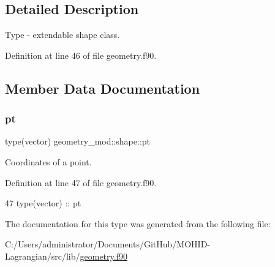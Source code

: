 \subsection{Detailed Description}
Type -\/ extendable shape class. 

Definition at line 46 of file geometry.\+f90.



\subsection{Member Data Documentation}
\mbox{\label{structgeometry__mod_1_1shape_a4c7824c0af103efbef53cbcacb9a5de0}} 
\subsubsection{\texorpdfstring{pt}{pt}}
{\footnotesize\ttfamily type(vector) geometry\+\_\+mod\+::shape\+::pt\hspace{0.3cm}{\ttfamily [private]}}



Coordinates of a point. 



Definition at line 47 of file geometry.\+f90.


\begin{DoxyCode}
47         \textcolor{keywordtype}{type}(vector) :: pt
\end{DoxyCode}


The documentation for this type was generated from the following file\+:\begin{DoxyCompactItemize}
\item 
C\+:/\+Users/administrator/\+Documents/\+Git\+Hub/\+M\+O\+H\+I\+D-\/\+Lagrangian/src/lib/\mbox{\hyperlink{geometry_8f90}{geometry.\+f90}}\end{DoxyCompactItemize}
